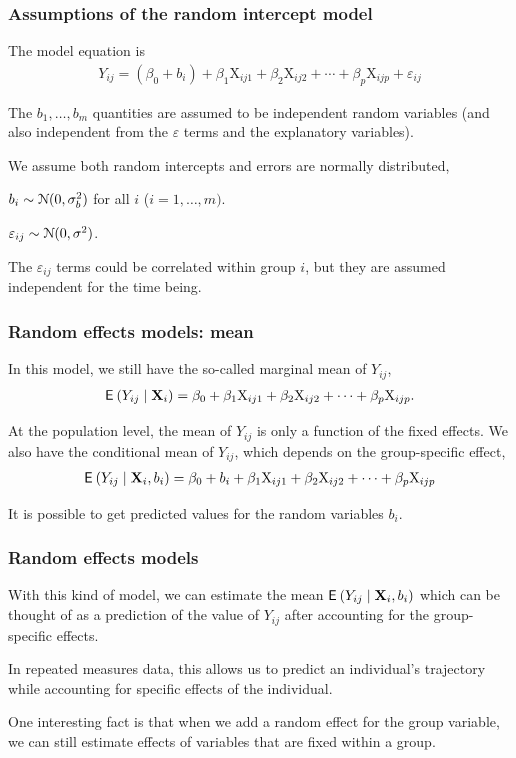 \documentclass{beamer}
\begin{document}
\begin{frame}[fragile]
\frametitle{Assumptions of the random intercept model}
The model equation is
\begin{align*}
Y_{ij}=(\beta_0+b_i)+ \beta_1 \mathrm{X}_{ij1}+\beta_2\mathrm{X}_{ij2}+\cdots+\beta_p\mathrm{X}_{ijp} + \varepsilon_{ij}
\end{align*}
\bi
\item The $b_1, \ldots, b_m$ quantities are assumed to be \alert{independent} random variables (and also independent from the $\varepsilon$ terms and the explanatory variables).
\item We assume both random intercepts and errors are normally distributed,
\bi \item $b_i\sim \mathcal{N}(0, \sigma^2_b)$ for all $i$ ($i=1, \ldots, m)$.
\item $\varepsilon_{ij}\sim \mathcal{N}(0, \sigma^2)$.
\ei
\item The $\varepsilon_{ij}$ terms could be correlated within group $i$, but they are assumed independent for the time being.
\ei
\end{frame}




\begin{frame}[fragile]
\frametitle{Random effects models: mean}
In this model, we still have the so-called \alert{marginal mean} of $Y_{ij}$,
\begin{align*}
{\mathsf E}_{}\left(Y_{ij}\mid \mathbf{X}_i\right)=\beta_0+\beta_1\mathrm{X}_{ij1}+\beta_2\mathrm{X}_{ij2}+\cdots + \beta_p\mathrm{X}_{ijp}.
\end{align*}
\bi
\item At the population level, the mean of $Y_{ij}$ is only a function of the fixed effects. 
\ei
We also have the \alert{conditional mean} of $Y_{ij}$, which depends on the group-specific effect,
\begin{align*}
{\mathsf E}_{}\left(Y_{ij}\mid \mathbf{X}_i, b_i\right)=\beta_0+b_i+\beta_1\mathrm{X}_{ij1}+\beta_2\mathrm{X}_{ij2}+\cdots + \beta_p\mathrm{X}_{ijp}
\end{align*}
\bi
\item It is possible to get predicted values for the random variables $b_i$.
\ei
\end{frame}


\begin{frame}[fragile]
\frametitle{Random effects models}
\bi
\item With this kind of model, we can estimate the mean ${\mathsf E}_{}\left(Y_{ij}\mid \mathbf{X}_i, b_i\right)$  which can be thought of as a \alert{prediction} of the value of $Y_{ij}$ after accounting for the group-specific effects. 
\item In repeated measures data, this allows us to predict an individual's trajectory
while accounting for specific effects of the individual.
\item One interesting fact is that when we add a random effect for the group variable, we can still estimate effects of variables that are fixed within a group.
\ei
\end{frame}
\end{document}
